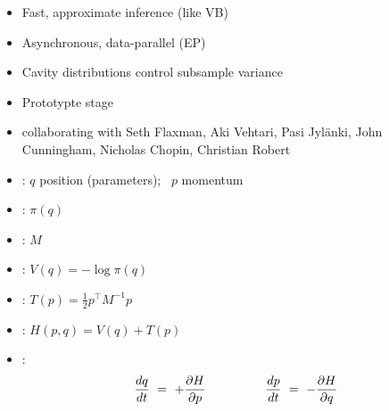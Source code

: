 \documentclass[10pt]{report}
\begin{document}
\begin{itemize}
\item Fast, approximate inference (like VB)
%
\item Asynchronous, data-parallel 
  (EP)
\item Cavity distributions control subsample variance
%
\vfill
%
\item Prototypte stage
\item {\small collaborating with Seth Flaxman, Aki Vehtari, Pasi
    Jyl\"anki, John Cunningham, Nicholas Chopin, Christian Robert}
\end{itemize}




\begin{itemize}
\item {}: $q$ position (parameters); \ $p$ momentum
\item {}: $\pi(q)$
\item {}: $M$
\item {}: $V(q) = -\log \pi(q)$
\item {}: $T(p) = \frac{1}{2} p^{\top} M^{-1} p$
\item {}:  $H(p,q) = V(q) + T(p)$
\item {}:
  \[
  \frac{dq}{dt} \ = \  + \frac{\partial H}{\partial p}
  \hspace*{48pt}
  \frac{dp}{dt} \ = \ - \frac{\partial H}{\partial q}
  \]
\end{itemize}
\end{document}
